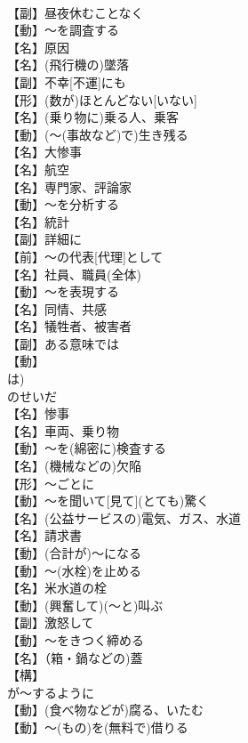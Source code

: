 \documentclass[8pt]{extreport}
\begin{document}
\begin{CJK}{UTF8}{min}
\\	【副】昼夜休むことなく
\\	【動】～を調査する
\\	【名】原因
\\	【名】(飛行機の)墜落
\\	【副】不幸[不運]にも
\\	【形】(数が)ほとんどない[いない]
\\	【名】(乗り物に)乗る人、乗客
\\	【動】(～(事故など)で)生き残る
\\	【名】大惨事
\\	【名】航空
\\	【名】専門家、評論家
\\	【動】～を分析する
\\	【名】統計
\\	【副】詳細に
\\	【前】～の代表[代理]として
\\	【名】社員、職員(全体)
\\	【動】～を表現する
\\	【名】同情、共感
\\	【名】犠牲者、被害者
\\	【副】ある意味では
\\	【動】
\\	は)
\\	のせいだ
\\	【名】惨事
\\	【名】車両、乗り物
\\	【動】～を(綿密に)検査する
\\	【名】(機械などの)欠陥
\\	【形】～ごとに
\\	【動】～を聞いて[見て](とても)驚く
\\	【名】(公益サービスの)電気、ガス、水道
\\	【名】請求書
\\	【動】(合計が)～になる
\\	【動】～(水栓)を止める
\\	【名】{米}水道の栓
\\	【動】(興奮して)(～と)叫ぶ
\\	【副】激怒して
\\	【動】～をきつく締める
\\	【名】（箱・鍋などの)蓋
\\	【構】
\\	が～するように
\\	【動】(食べ物などが)腐る、いたむ
\\	【動】～(もの)を(無料で)借りる

\end{CJK}
\end{document}
